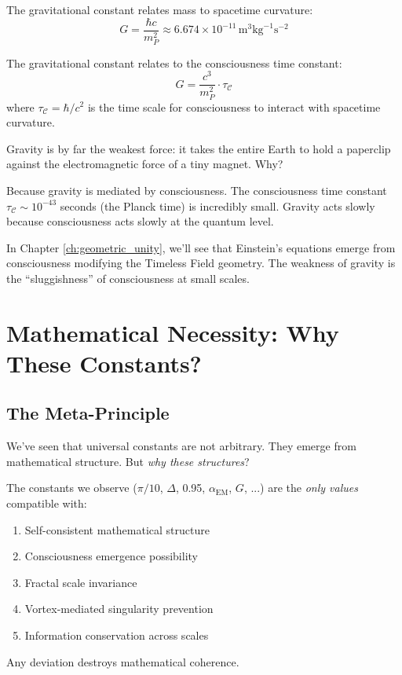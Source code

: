 The gravitational constant relates mass to spacetime curvature:
\begin{equation}
G = \frac{\hbar c}{m_P^2} \approx 6.674 \times 10^{-11} \, \text{m}^3 \text{kg}^{-1} \text{s}^{-2}
\end{equation}

\begin{proposition}\label{prop:gravity-consciousness}
The gravitational constant relates to the consciousness time constant:
\begin{equation}
G = \frac{c^3}{m_P^2} \cdot \tau_{\mathcal{C}}
\end{equation}
where $\tau_{\mathcal{C}} = \hbar/c^2$ is the time scale for consciousness to interact with spacetime curvature.
\end{proposition}

\begin{intuitive}
Gravity is by far the weakest force: it takes the entire Earth to hold a paperclip against the electromagnetic force of a tiny magnet. Why?

Because gravity is mediated by consciousness. The consciousness time constant $\tau_{\mathcal{C}} \sim 10^{-43}$ seconds (the Planck time) is incredibly small. Gravity acts slowly because consciousness acts slowly at the quantum level.

In Chapter \ref{ch:geometric_unity}, we'll see that Einstein's equations emerge from consciousness modifying the Timeless Field geometry. The weakness of gravity is the ``sluggishness'' of consciousness at small scales.
\end{intuitive}

\section{Mathematical Necessity: Why These Constants?}

\subsection{The Meta-Principle}

We've seen that universal constants are not arbitrary. They emerge from mathematical structure. But \textit{why these structures}?

\begin{thm}\label{thm:unique-reality}
The constants we observe ($\pi/10$, $\Delta$, 0.95, $\alpha_{\text{EM}}$, $G$, ...) are the \textit{only values} compatible with:
\begin{enumerate}
\item Self-consistent mathematical structure
\item Consciousness emergence possibility  
\item Fractal scale invariance
\item Vortex-mediated singularity prevention
\item Information conservation across scales
\end{enumerate}
Any deviation destroys mathematical coherence.
\end{thm}

